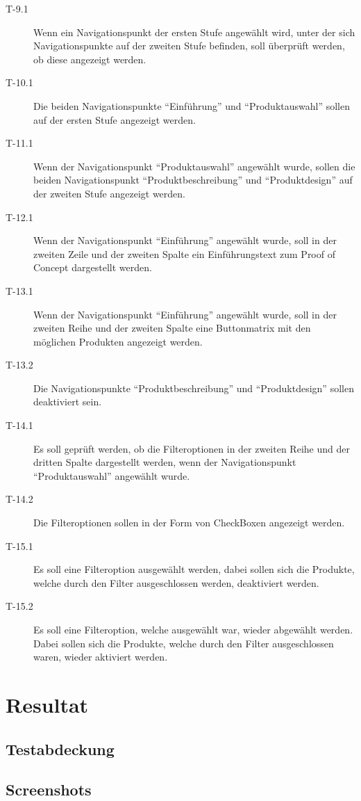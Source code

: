 \begin{description}
\item[T-9.1\label{itm:T-9.1}]
Wenn ein Navigationspunkt der ersten Stufe angewählt wird, unter der sich
Navigationspunkte auf der zweiten Stufe befinden, soll überprüft werden, ob
diese angezeigt werden.

\item[T-10.1\label{itm:T-10.1}]
Die beiden Navigationspunkte ``Einführung'' und ``Produktauswahl'' sollen auf
der ersten Stufe angezeigt werden.

\item[T-11.1\label{itm:T-11.1}]
Wenn der Navigationspunkt ``Produktauswahl'' angewählt wurde, sollen die beiden
Navigationspunkt ``Produktbeschreibung'' und ``Produktdesign'' auf der zweiten
Stufe angezeigt werden.

\item[T-12.1\label{itm:T-12.1}]
Wenn der Navigationspunkt ``Einführung'' angewählt wurde, soll in der zweiten
Zeile und der zweiten Spalte ein Einführungstext zum Proof of Concept
dargestellt werden.

\item[T-13.1\label{itm:T-13.1}]
Wenn der Navigationspunkt ``Einführung'' angewählt wurde, soll in der zweiten
Reihe und der zweiten Spalte eine Buttonmatrix mit den möglichen Produkten
angezeigt werden.

\item[T-13.2\label{itm:T-13.2}]
Die Navigationspunkte ``Produktbeschreibung'' und ``Produktdesign'' sollen
deaktiviert sein.

\item[T-14.1\label{itm:T-14.1}]
Es soll geprüft werden, ob die Filteroptionen in der zweiten Reihe und der
dritten Spalte dargestellt werden, wenn der Navigationspunkt ``Produktauswahl''
angewählt wurde.

\item[T-14.2\label{itm:T-14.2}]
Die Filteroptionen sollen in der Form von CheckBoxen angezeigt werden.

\item[T-15.1\label{itm:T-15.1}]
Es soll eine Filteroption ausgewählt werden, dabei sollen sich die Produkte,
welche durch den Filter ausgeschlossen werden, deaktiviert werden.

\item[T-15.2\label{itm:T-15.2}]
Es soll eine Filteroption, welche ausgewählt war, wieder abgewählt werden. Dabei
sollen sich die Produkte, welche durch den Filter ausgeschlossen waren, wieder
aktiviert werden.

\end{description}

\section{Resultat}

\subsection{Testabdeckung}

\subsection{Screenshots}